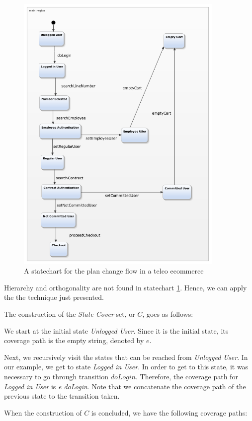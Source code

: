 \begin{figure}[htb]
\centering
\includegraphics[width=10cm]{figuras/trocaPlano}
\caption{\label{fig:trocaPlano} A statechart for the plan change flow in a telco ecommerce}
\end{figure}

Hierarchy and orthogonality are not found in statechart \ref{fig:trocaPlano}. Hence, we can apply the the technique just presented.

The construction of the \textit{State Cover} set, or $C$, goes as follows:

We start at the initial state \textit{Unlogged User}. Since it is the initial state, its coverage path is the empty string, denoted by $e$.

Next, we recursively visit the states that can be reached from \textit{Unlogged User}. In our example, we get to state \textit{Logged in User}. In order to get to this state, it was necessary to go through transition $doLogin$. Therefore, the coverage path for \textit{Logged in User} is \textit{e doLogin}. Note that we concatenate the coverage path of the previous state to the transition taken.

When the construction of $C$ is concluded, we have the following coverage paths:

